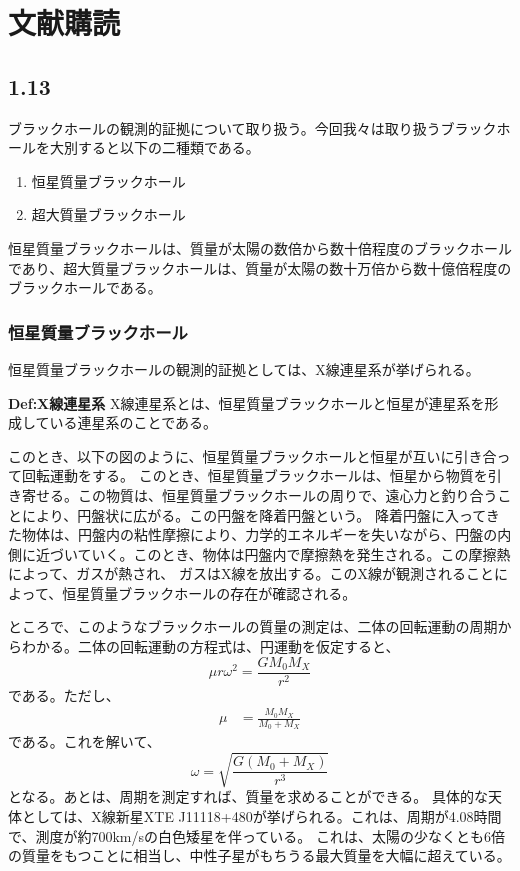 \documentclass[a4paper,11pt]{jsarticle}
\numberwithin{equation}{section}
\begin{document}
\section{文献購読}
\subsection{1.13}
ブラックホールの観測的証拠について取り扱う。今回我々は取り扱うブラックホールを大別すると以下の二種類である。
\begin{enumerate}
  \item 恒星質量ブラックホール
  \item 超大質量ブラックホール
\end{enumerate}
恒星質量ブラックホールは、質量が太陽の数倍から数十倍程度のブラックホールであり、超大質量ブラックホールは、質量が太陽の数十万倍から数十億倍程度のブラックホールである。

\subsubsection{恒星質量ブラックホール}
恒星質量ブラックホールの観測的証拠としては、X線連星系が挙げられる。
\begin{itembox}[l]{\textbf{Def:X線連星系}}
  X線連星系とは、恒星質量ブラックホールと恒星が連星系を形成している連星系のことである。

\end{itembox}
このとき、以下の図のように、恒星質量ブラックホールと恒星が互いに引き合って回転運動をする。
このとき、恒星質量ブラックホールは、恒星から物質を引き寄せる。この物質は、恒星質量ブラックホールの周りで、遠心力と釣り合うことにより、円盤状に広がる。この円盤を降着円盤という。
降着円盤に入ってきた物体は、円盤内の粘性摩擦により、力学的エネルギーを失いながら、円盤の内側に近づいていく。このとき、物体は円盤内で摩擦熱を発生される。この摩擦熱によって、ガスが熱され、
ガスはX線を放出する。このX線が観測されることによって、恒星質量ブラックホールの存在が確認される。

ところで、このようなブラックホールの質量の測定は、二体の回転運動の周期からわかる。二体の回転運動の方程式は、円運動を仮定すると、
\begin{equation}
  \mu r\omega^2 = \frac{GM_0M_X}{r^2}
\end{equation}
である。ただし、
\begin{align}
  \mu &= \frac{M_0M_X}{M_0+M_X} 
\end{align}
である。これを解いて、
\begin{equation}
  \omega = \sqrt{\frac{G(M_0+M_X)}{r^3}}
\end{equation}
となる。あとは、周期を測定すれば、質量を求めることができる。
具体的な天体としては、X線新星XTE J11118+480が挙げられる。これは、周期が4.08時間で、測度が約700km/sの白色矮星を伴っている。
これは、太陽の少なくとも6倍の質量をもつことに相当し、中性子星がもちうる最大質量を大幅に超えている。
\end{document}
